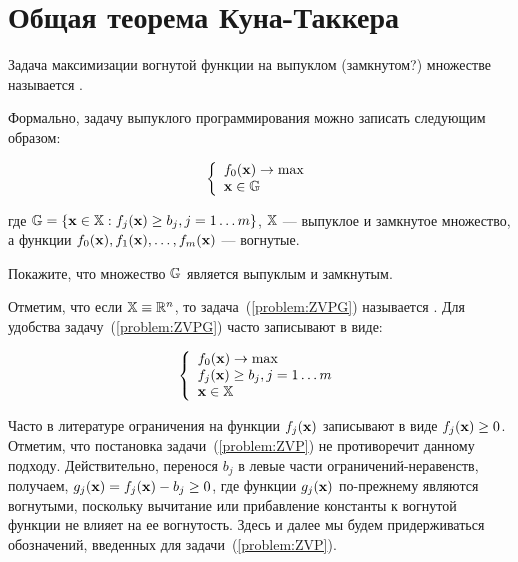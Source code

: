 \section{Общая теорема Куна-Таккера}

\begin{dfn}
Задача максимизации вогнутой функции на выпуклом (замкнутом?)
множестве называется .
\end{dfn}

Формально, задачу выпуклого программирования можно записать
следующим образом:

\begin{equation}\label{problem:ZVPG}
\left\{ \begin{array}{l}
 f_0(\mathbf{x}) \to \max  \\
 \mathbf{x} \in \mathbb{G} \\
 \end{array} \right.
\end{equation}

\noindent где $\mathbb{G}=\{\mathbf{x} \in \mathbb{X}:  f_j (\mathbf{x}) \geq b_j, j
= 1 \ldots m \}$, $\mathbb{X}$ --- выпуклое и замкнутое множество, а
функции $f_0(\mathbf{x}), f_1(\mathbf{x}), \ldots, f_m(\mathbf{x})$ ---
вогнутые.

\begin{exer}
Покажите, что множество $\mathbb{G}$ является выпуклым и замкнутым.
\end{exer}

Отметим, что если $\mathbb{X}\equiv \mathbb{R}^n$, то
задача~(\ref{problem:ZVPG}) называется . Для удобства
задачу~(\ref{problem:ZVPG}) часто записывают в виде:

\begin{equation}\label{problem:ZVP}
\left\{ \begin{array}{l}
 f_0(\mathbf{x}) \to \max  \\
 f_j (\mathbf{x}) \geq b_j, j = 1 \ldots m\\
 \mathbf{x} \in \mathbb{X} \\
 \end{array} \right.
\end{equation}

Часто в литературе ограничения на функции $f_j(\mathbf{x})$ записывают в
виде $f_j (\mathbf{x}) \geq 0$. Отметим, что постановка
задачи~(\ref{problem:ZVP}) не противоречит данному подходу.
Действительно, перенося $b_j$ в левые части ограничений-неравенств,
получаем, $g_j (\mathbf{x})=f_j (\mathbf{x}) - b_j\geq 0$, где функции $g_j
(\mathbf{x})$ по-прежнему являются вогнутыми, поскольку вычитание или
прибавление константы к вогнутой функции не влияет на ее вогнутость.
Здесь и далее мы будем придерживаться обозначений, введенных для
задачи~(\ref{problem:ZVP}).

